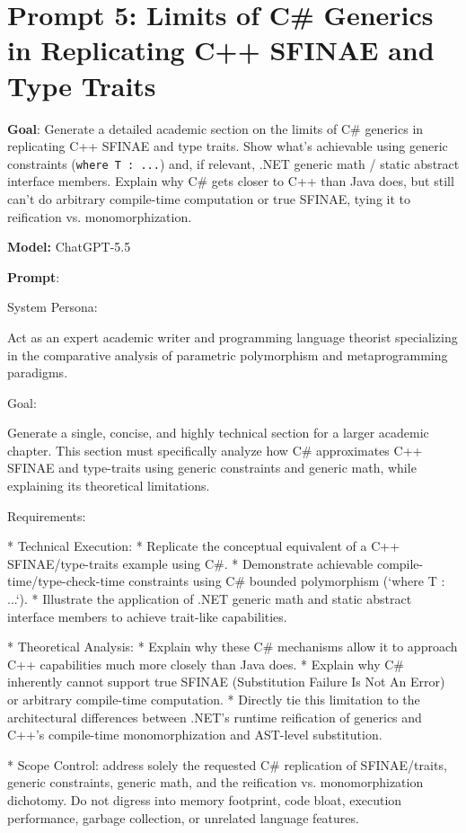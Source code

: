 \documentclass[11pt]{report}
\begin{document}
\section{Prompt 5: Limits of C\# Generics in Replicating C++ SFINAE and Type Traits}

\noindent\textbf{Goal}: Generate a detailed academic section on the limits of C\# generics in replicating C++ SFINAE and type traits. Show what's achievable using generic constraints (\texttt{where T : ...}) and, if relevant, .NET generic math / static abstract interface members. Explain why C\# gets closer to C++ than Java does, but still can't do arbitrary compile-time computation or true SFINAE, tying it to reification vs. monomorphization.

\noindent\textbf{Model:} ChatGPT-5.5

\noindent\textbf{Prompt}:
\begin{PromptVerbatim}
System Persona:

Act as an expert academic writer and programming language theorist specializing in the comparative analysis of parametric polymorphism and metaprogramming paradigms.

Goal:

Generate a single, concise, and highly technical section for a larger academic chapter. This section must specifically analyze how C\# approximates C++ SFINAE and type-traits using generic constraints and generic math, while explaining its theoretical limitations.

Requirements:

* Technical Execution:
* Replicate the conceptual equivalent of a C++ SFINAE/type-traits example using C\#.
* Demonstrate achievable compile-time/type-check-time constraints using C\# bounded polymorphism (`where T : ...`).
* Illustrate the application of .NET generic math and static abstract interface members to achieve trait-like capabilities.

* Theoretical Analysis:
* Explain why these C\# mechanisms allow it to approach C++ capabilities much more closely than Java does.
* Explain why C\# inherently cannot support true SFINAE (Substitution Failure Is Not An Error) or arbitrary compile-time computation.
* Directly tie this limitation to the architectural differences between .NET's runtime reification of generics and C++'s compile-time monomorphization and AST-level substitution.

* Scope Control: address solely the requested C\# replication of SFINAE/traits, generic constraints, generic math, and the reification vs. monomorphization dichotomy. Do not digress into memory footprint, code bloat, execution performance, garbage collection, or unrelated language features.
\end{PromptVerbatim}
\end{document}
